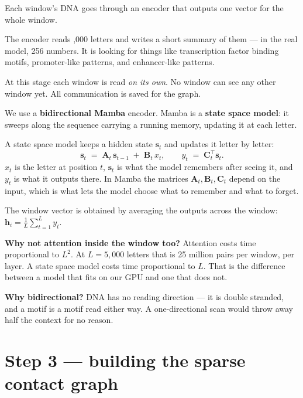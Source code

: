 \documentclass[11pt,a4paper]{article}
\newcommand{\hvec}[1]{\mathbf{h}_{#1}}
\newcommand{\term}[1]{\textcolor{deepblue}{\textbf{#1}}}
\begin{document}
Each window's DNA goes through an encoder that outputs one vector for the whole
window.

\begin{plainbox}
The encoder reads \WEbinkb{},000 letters and writes a short summary of them ---
in the real model, 256 numbers. It is looking for things like transcription
factor binding motifs, promoter-like patterns, and enhancer-like patterns.

At this stage each window is read \emph{on its own}. No window can see any other
window yet. All communication is saved for the graph.
\end{plainbox}

We use a \term{bidirectional Mamba} encoder. Mamba is a \term{state space model}: it
sweeps along the sequence carrying a running memory, updating it at each letter.

\begin{mathbox}
A state space model keeps a hidden state $\mathbf{s}_t$ and updates it letter by
letter:
\[
\mathbf{s}_t \;=\; \mathbf{A}_t\,\mathbf{s}_{t-1} \;+\; \mathbf{B}_t\, x_t,
\qquad
y_t \;=\; \mathbf{C}_t^\top \mathbf{s}_t .
\]
$x_t$ is the letter at position $t$, $\mathbf{s}_t$ is what the model remembers
after seeing it, and $y_t$ is what it outputs there. In Mamba the matrices
$\mathbf{A}_t, \mathbf{B}_t, \mathbf{C}_t$ depend on the input, which is what lets
the model choose what to remember and what to forget.

The window vector is obtained by averaging the outputs across the window:
$\hvec{i} = \frac{1}{L}\sum_{t=1}^{L} y_t$.
\end{mathbox}

\begin{whybox}
\textbf{Why not attention inside the window too?} Attention costs time
proportional to $L^2$. At $L = 5{,}000$ letters that is 25 million pairs per
window, per layer. A state space model costs time proportional to $L$. That is
the difference between a model that fits on our GPU and one that does not.

\textbf{Why bidirectional?} DNA has no reading direction --- it is double
stranded, and a motif is a motif read either way. A one-directional scan would
throw away half the context for no reason.
\end{whybox}

\section{Step 3 --- building the sparse contact graph}
\label{sec:detrend}
\end{document}
